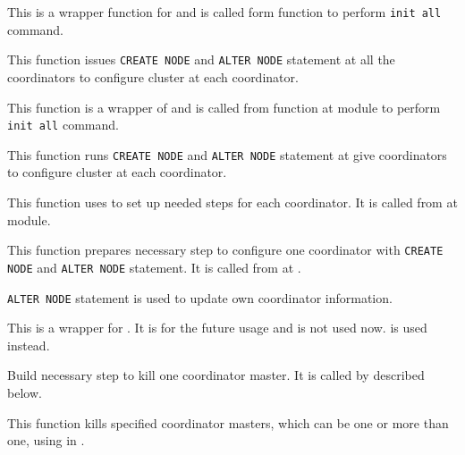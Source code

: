   
      This is a wrapper function for  and is called form 
      function to perform \texttt{init all} command.
  
  
      This function issues \texttt{CREATE NODE} and \texttt{ALTER NODE} statement at all the coordinators
      to configure \XC{} cluster at each coordinator.
      
      This function is a wrapper of  and is called from
	   function at  module to perform
	  \texttt{init all} command.
  
  
      This function runs \texttt{CREATE NODE} and \texttt{ALTER NODE} statement at give coordinators
      to configure \XC{} cluster at each coordinator.
      
      This function uses  to set up needed steps for each coordinator.
      It is called from  at  module.
  
  
      This function prepares necessary step to configure one coordinator with
	  \texttt{CREATE NODE} and \texttt{ALTER NODE} statement.
      It is called from  at .
      
      \texttt{ALTER NODE} statement is used to update own coordinator information.
  
  
      This is a wrapper for .
      It is for the future usage and is not used now.
       is used instead.
  
  
      Build necessary step to kill one coordinator master.
      It is called by  described below.
  
  
      This function kills specified coordinator masters, which can be one or more than one,
	  using  in .
  
